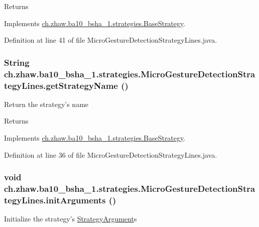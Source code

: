 \begin{DoxyReturn}{Returns}

\end{DoxyReturn}


Implements \hyperlink{classch_1_1zhaw_1_1ba10__bsha__1_1_1strategies_1_1BaseStrategy_a75fdb36932ad701f6375cc1fe718056b}{ch.zhaw.ba10\_\-bsha\_\-1.strategies.BaseStrategy}.

Definition at line 41 of file MicroGestureDetectionStrategyLines.java.\hypertarget{classch_1_1zhaw_1_1ba10__bsha__1_1_1strategies_1_1MicroGestureDetectionStrategyLines_a9e856240313caac95a363e99bfac2474}{
\subsubsection[{getStrategyName}]{\setlength{\rightskip}{0pt plus 5cm}String ch.zhaw.ba10\_\-bsha\_\-1.strategies.MicroGestureDetectionStrategyLines.getStrategyName ()}}
\label{classch_1_1zhaw_1_1ba10__bsha__1_1_1strategies_1_1MicroGestureDetectionStrategyLines_a9e856240313caac95a363e99bfac2474}
Return the strategy's name

\begin{DoxyReturn}{Returns}

\end{DoxyReturn}


Implements \hyperlink{classch_1_1zhaw_1_1ba10__bsha__1_1_1strategies_1_1BaseStrategy_aa0ebed55eed45409bad13d43a0058780}{ch.zhaw.ba10\_\-bsha\_\-1.strategies.BaseStrategy}.

Definition at line 36 of file MicroGestureDetectionStrategyLines.java.\hypertarget{classch_1_1zhaw_1_1ba10__bsha__1_1_1strategies_1_1MicroGestureDetectionStrategyLines_a2c3a3cda170672d79a797c0d3060e9d7}{
\subsubsection[{initArguments}]{\setlength{\rightskip}{0pt plus 5cm}void ch.zhaw.ba10\_\-bsha\_\-1.strategies.MicroGestureDetectionStrategyLines.initArguments ()}}
\label{classch_1_1zhaw_1_1ba10__bsha__1_1_1strategies_1_1MicroGestureDetectionStrategyLines_a2c3a3cda170672d79a797c0d3060e9d7}
Initialize the strategy's \hyperlink{classch_1_1zhaw_1_1ba10__bsha__1_1_1StrategyArgument}{StrategyArgument}s 

